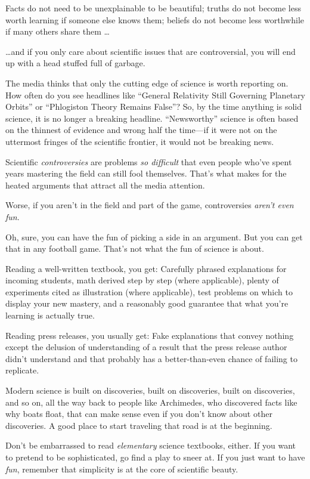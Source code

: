 {
 Facts do not need to be unexplainable to be beautiful; truths do
not become less worth learning if someone else knows them; beliefs do
not become less worthwhile if many others share them \ldots }

{
 \ldots and if you only care about scientific issues that are
controversial, you will end up with a head stuffed full of garbage.}

{
 The media thinks that only the cutting edge of science is worth
reporting on. How often do you see headlines like
``General Relativity Still Governing Planetary
Orbits'' or ``Phlogiston Theory
Remains False''? So, by the time anything is solid
science, it is no longer a breaking headline.
``Newsworthy'' science is often
based on the thinnest of evidence and wrong half the time---if it were
not on the uttermost fringes of the scientific frontier, it would not
be breaking news.}

{
 Scientific \textit{controversies} are problems \textit{so
difficult} that even people who've spent years
mastering the field can still fool themselves. That's
what makes for the heated arguments that attract all the media
attention.}

{
 Worse, if you aren't in the field and part of the
game, controversies \textit{aren't even fun}.}

{
 Oh, sure, you can have the fun of picking a side in an argument.
But you can get that in any football game. That's not
what the fun of science is about.}

{
 Reading a well-written textbook, you get: Carefully phrased
explanations for incoming students, math derived step by step (where
applicable), plenty of experiments cited as illustration (where
applicable), test problems on which to display your new mastery, and a
reasonably good guarantee that what you're learning is
actually true.}

{
 Reading press releases, you usually get: Fake explanations that
convey nothing except the delusion of understanding of a result that
the press release author didn't understand and that
probably has a better-than-even chance of failing to replicate.}

{
 Modern science is built on discoveries, built on discoveries,
built on discoveries, and so on, all the way back to people like
Archimedes, who discovered facts like why boats float, that can make
sense even if you don't know about other discoveries. A
good place to start traveling that road is at the beginning.}

{
 Don't be embarrassed to read \textit{elementary}
science textbooks, either. If you want to pretend to be sophisticated,
go find a play to sneer at. If you just want to have \textit{fun},
remember that simplicity is at the core of scientific beauty.}

